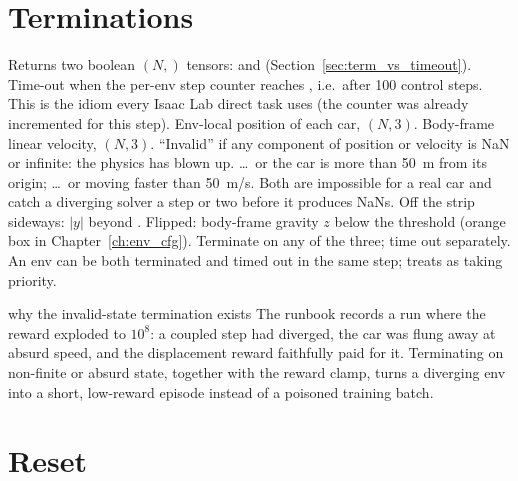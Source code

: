 \section{Terminations}


\begin{explain}
 Returns two boolean $(N,)$ tensors:  and
   (Section~\ref{sec:term_vs_timeout}).
 Time-out when the per-env step counter reaches
  , i.e.\ after 100 control steps. This is the
  idiom every Isaac Lab direct task uses (the counter was already
  incremented for this step).
 Env-local position of each car, $(N,3)$.
 Body-frame linear velocity, $(N,3)$.
 ``Invalid'' if any component of position or velocity is NaN or
  infinite: the physics has blown up.
 \ldots\ or the car is more than 50~m from its origin;
 \ldots\ or moving faster than 50~m/s. Both are impossible for a real
  car and catch a diverging solver a step or two before it produces NaNs.
 Off the strip sideways: $|y|$ beyond .
 Flipped: body-frame gravity $z$ below the threshold (orange box in
  Chapter~\ref{ch:env_cfg}).
 Terminate on any of the three; time out separately. An env can be
  both terminated and timed out in the same step;  treats
   as taking priority.
\end{explain}

\begin{whybox}{why the invalid-state termination exists}
The runbook records a run where the reward exploded to $10^8$: a coupled
step had diverged, the car was flung away at absurd speed, and the
displacement reward faithfully paid for it. Terminating on non-finite or
absurd state, together with the reward clamp, turns a diverging env into a
short, low-reward episode instead of a poisoned training batch.
\end{whybox}

\section{Reset}


